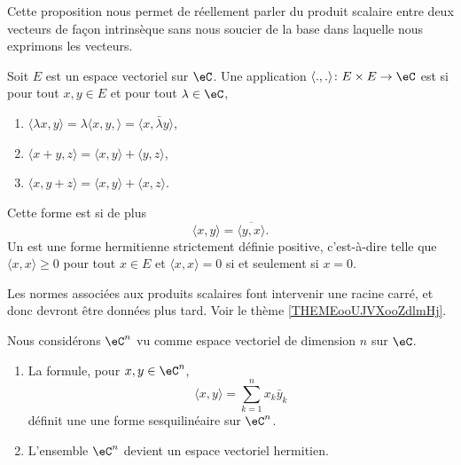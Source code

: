 Cette proposition nous permet de réellement parler du produit scalaire entre deux vecteurs de façon intrinsèque sans nous soucier de la base dans laquelle nous exprimons les vecteurs.

\begin{definition}  \label{DefMZQxmQ}
	Soit \( E\) est un espace vectoriel sur \( \eC\). Une application \( \langle ., .\rangle \colon E\times E\to \eC\) est  si pour tout \( x,y\in E\) et pour tout \( \lambda\in \eC\),
	\begin{enumerate}
		\item
		      \( \langle \lambda x, y\rangle =\lambda\langle x,y, \rangle =\langle x, \bar\lambda y\rangle \),
		\item
		      \( \langle x+y, z\rangle =\langle x, y\rangle+\langle y, z\rangle  \),
		\item
		      \( \langle x, y+z\rangle =\langle x, y\rangle +\langle x, z\rangle \).
	\end{enumerate}
	Cette forme est  si de plus
	\begin{equation}
		\langle x, y\rangle =\overline{ \langle y, x\rangle  }.
	\end{equation}
	Un  est une forme hermitienne strictement définie positive, c'est-à-dire telle que \( \langle x, x\rangle \geq 0\) pour tout \( x\in E\) et \( \langle x, x\rangle =0\) si et seulement si \( x=0\).
\end{definition}

\begin{normaltext}
	Les normes associées aux produits scalaires font intervenir une racine carré, et donc devront être données plus tard. Voir le thème \ref{THEMEooUJVXooZdlmHj}.
\end{normaltext}

\begin{proposition}      \label{PROPooMWUCooMbJuaJ}
	Nous considérons \(\eC^n\) vu comme espace vectoriel de dimension \( n\) sur \( \eC\).
	\begin{enumerate}
		\item
		      La formule, pour \( x,y\in \eC^n\),
		      \begin{equation}    \label{EqFormSesqQrjyPH}
			      \langle x, y\rangle =\sum_{k=1}^nx_k\bar y_k
		      \end{equation}
		      définit une une forme sesquilinéaire sur \( \eC^n\).
		\item
		      L'ensemble \( \eC^n\) devient un espace vectoriel hermitien.
	\end{enumerate}
\end{proposition}


